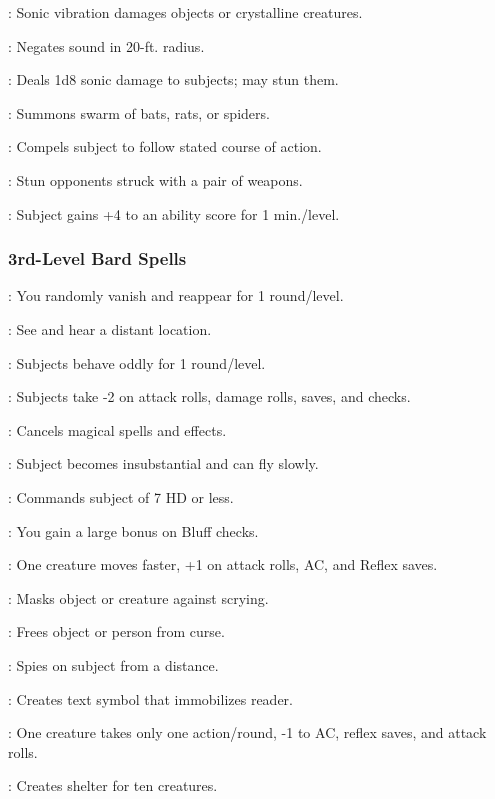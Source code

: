 \begin{list}{}{\leftmargin=1em}
\item {}: Sonic vibration damages objects or crystalline creatures.
\item {}: Negates sound in 20-ft. radius.
\item {}: Deals 1d8 sonic damage to subjects; may stun them.
\item {}: Summons swarm of bats, rats, or spiders.
\item {}: Compels subject to follow stated course of action.
\item {}: Stun opponents struck with a pair of weapons.
\item {}: Subject gains +4 to an ability score for 1 min./level.
\end{list}
\subsubsection{3rd-Level Bard Spells}
\begin{list}{}{\leftmargin=1em}
\item {}: You randomly vanish and reappear for 1 round/level.
\item {}: See and hear a distant location.
\item {}: Subjects behave oddly for 1 round/level.
\item {}: Subjects take -2 on attack rolls, damage rolls, saves, and checks.
\item {}: Cancels magical spells and effects.
\item {}: Subject becomes insubstantial and can fly slowly.
\item {}: Commands subject of 7 HD or less.
\item {}: You gain a large bonus on Bluff checks.
\item {}: One creature moves faster, +1 on attack rolls, AC, and Reflex saves.
\item {}: Masks object or creature against scrying.
\item {}: Frees object or person from curse.
\item {}: Spies on subject from a distance.
\item {}: Creates text symbol that immobilizes reader.
\item {}: One creature takes only one action/round, -1 to AC, reflex saves, and attack rolls.
\item {}: Creates shelter for ten creatures.
\end{list}
